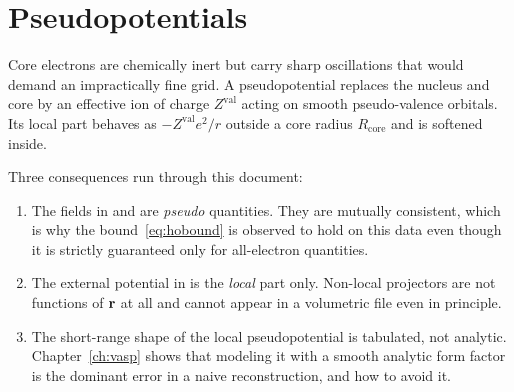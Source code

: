 \section{Pseudopotentials}

Core electrons are chemically inert but carry sharp oscillations that would
demand an impractically fine grid. A pseudopotential replaces the nucleus and
core by an effective ion of charge $Z^{\mathrm{val}}$ acting on smooth
pseudo-valence orbitals. Its local part behaves as
$-Z^{\mathrm{val}}e^2/r$ outside a core radius $R_{\mathrm{core}}$ and is
softened inside.

Three consequences run through this document:

\begin{enumerate}
  \item The fields in  and  are
    \emph{pseudo} quantities. They are mutually consistent, which is why the
    bound~\eqref{eq:hobound} is observed to hold on this data even though it is
    strictly guaranteed only for all-electron quantities.
  \item The external potential in  is the \emph{local} part only.
    Non-local projectors are not functions of $\mathbf{r}$ at all and cannot appear in
    a volumetric file even in principle.
  \item The short-range shape of the local pseudopotential is tabulated, not
    analytic. Chapter~\ref{ch:vasp} shows that modeling it with a smooth
    analytic form factor is the dominant error in a naive reconstruction, and
    how to avoid it.
\end{enumerate}

